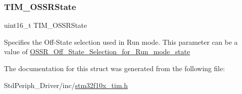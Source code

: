 \subsubsection{\texorpdfstring{TIM\_OSSRState}{TIM\_OSSRState}}
{\footnotesize\ttfamily uint16\+\_\+t T\+I\+M\+\_\+\+O\+S\+S\+R\+State}

Specifies the Off-\/\+State selection used in Run mode. This parameter can be a value of \mbox{\hyperlink{group___o_s_s_r___off___state___selection__for___run__mode__state}{O\+S\+S\+R\+\_\+\+Off\+\_\+\+State\+\_\+\+Selection\+\_\+for\+\_\+\+Run\+\_\+mode\+\_\+state}} 

The documentation for this struct was generated from the following file\+:\begin{DoxyCompactItemize}
\item 
Std\+Periph\+\_\+\+Driver/inc/\mbox{\hyperlink{stm32f10x__tim_8h}{stm32f10x\+\_\+tim.\+h}}\end{DoxyCompactItemize}
